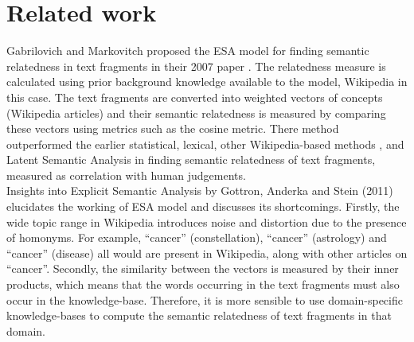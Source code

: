 \documentclass[journal,transmag]{IEEEtran}
\begin{document}
\section{\textbf{Related work}}

Gabrilovich and Markovitch proposed the ESA model for finding semantic relatedness in text fragments in their 2007 paper \cite{ESA}. The relatedness measure is calculated using prior background knowledge available to the model, Wikipedia in this case. The text fragments are converted into weighted vectors of concepts (Wikipedia articles) and their semantic relatedness is measured by comparing these vectors using metrics such as the cosine metric. There method outperformed the earlier statistical, lexical, other Wikipedia-based methods \cite{WikiRelate}, and Latent Semantic Analysis in finding semantic relatedness of text fragments, measured as correlation with human judgements.\\
Insights into Explicit Semantic Analysis by Gottron, Anderka and Stein (2011) \cite{insights} elucidates the working of ESA model and discusses its shortcomings. Firstly, the wide topic range in Wikipedia introduces noise and distortion due to the presence of homonyms. For example, ``cancer'' (constellation), ``cancer'' (astrology) and ``cancer'' (disease) all would are present in Wikipedia, along with other articles on “cancer”. Secondly, the similarity between the vectors is measured by their inner products, which means that the words occurring in the text fragments must also occur in the knowledge-base. Therefore, it is more sensible to use domain-specific knowledge-bases to compute the semantic relatedness of text fragments in that domain.

\end{document}
